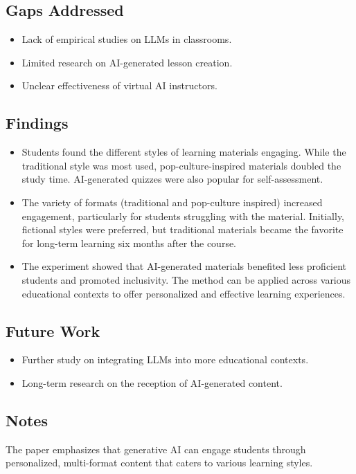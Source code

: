 \subsection{Gaps Addressed}
\begin{itemize}
    \item Lack of empirical studies on LLMs in classrooms.
    \item Limited research on AI-generated lesson creation.
    \item Unclear effectiveness of virtual AI instructors.
\end{itemize}

\subsection{Findings}
\begin{itemize}
    \item Students found the different styles of learning materials engaging. While the traditional style was most used, pop-culture-inspired materials doubled the study time. AI-generated quizzes were also popular for self-assessment.
    
    \item The variety of formats (traditional and pop-culture inspired) increased engagement, particularly for students struggling with the material. Initially, fictional styles were preferred, but traditional materials became the favorite for long-term learning six months after the course.
    
    \item The experiment showed that AI-generated materials benefited less proficient students and promoted inclusivity. The method can be applied across various educational contexts to offer personalized and effective learning experiences.
\end{itemize}


\subsection{Future Work}
\begin{itemize}
    \item Further study on integrating LLMs into more educational contexts.
    \item Long-term research on the reception of AI-generated content.
\end{itemize}

\subsection{Notes}
The paper emphasizes that generative AI can engage students through personalized, multi-format content that caters to various learning styles.
